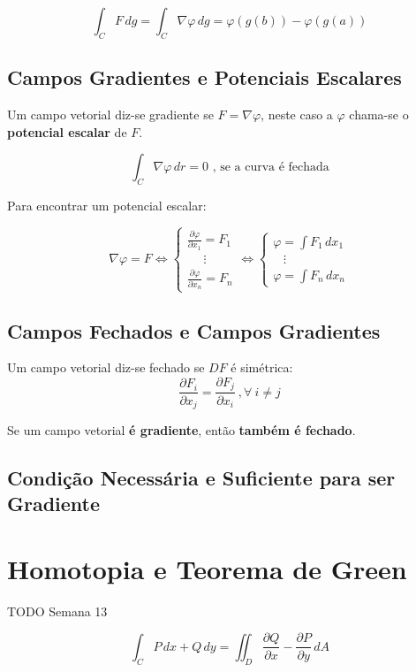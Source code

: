 \documentclass[11pt, a4paper]{article}
\begin{document}
\begin{equation*}
    \int_{C} F \, dg =
    \int_{C} \nabla\varphi \, dg =
    \varphi\left(g(b)\right) - \varphi\left(g(a)\right)
\end{equation*}

\subsection{Campos Gradientes e Potenciais Escalares}

Um campo vetorial diz-se gradiente se $F = \nabla\varphi$, neste caso a $\varphi$
chama-se o \textbf{potencial escalar} de $F$.

\begin{equation*}
    \int_{C} \nabla\varphi \, dr = 0 \text{ , se a curva é fechada}
\end{equation*}

Para encontrar um potencial escalar:

\begin{equation*}
    \nabla\varphi = F \Leftrightarrow
    \begin{cases}
        \frac{\partial \varphi}{\partial x_1} = F_1 \\
        \ \ \ \ \ \ \vdots                          \\
        \frac{\partial \varphi}{\partial x_n} = F_n
    \end{cases} \Leftrightarrow
    \begin{cases}
        \varphi = \int F_1 \, dx_1 \\
        \ \ \ \, \vdots            \\
        \varphi = \int F_n \, dx_n
    \end{cases}
\end{equation*}

\subsection{Campos Fechados e Campos Gradientes}

Um campo vetorial diz-se fechado se $DF$ é simétrica:
\begin{equation*}
    \frac{\partial F_i}{\partial x_j} = \frac{\partial F_j}{\partial x_i}
    \ , \forall \  i \neq j
\end{equation*}

Se um campo vetorial \textbf{é gradiente}, então \textbf{também é fechado}.

\subsection{Condição Necessária e Suficiente para ser Gradiente}

\section{Homotopia e Teorema de Green}

TODO Semana 13

\begin{equation*}
    \int_{C} P \, dx + Q \, dy =
    \iint_{D} \frac{\partial Q}{\partial x} - \frac{\partial P}{\partial y} \, dA
\end{equation*}
\end{document}
